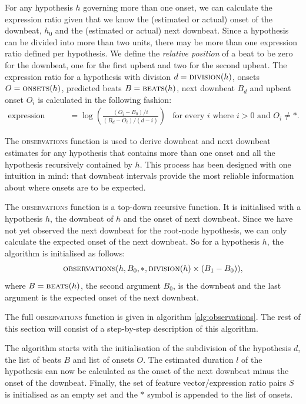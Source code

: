 For any hypothesis $h$ governing more than one onset, we can calculate the expression ratio given that we know the (estimated or actual) onset of the downbeat, $h_0$ and the (estimated or actual) next downbeat. Since a hypothesis can be divided into more than two units, there may be more than one expression ratio defined per hypothesis. We define the \textit{relative position} of a beat to be zero for the downbeat, one for the first upbeat and two for the second upbeat. The expression ratio for a hypothesis with division $d = \textsc{division}(h)$, onsets $O = \textsc{onsets}(h)$, predicted beats $B = \textsc{beats}(h)$, next downbeat $B_d$ and upbeat onset $O_i$ is calculated in the following fashion:
\begin{align}
\label{eq:expression}
\mbox{expression ratio} &= \log\left(\frac{(O_i - B_0) / i}{(B_d - O_i) / (d - i)}\right) & \text{for every $i$ where $i > 0$ and $O_i \neq *$.}
\end{align}

The \textsc{observations} function is used to derive downbeat and next downbeat estimates for any hypothesis that contains more than one onset and all the hypothesis recursively contained by $h$. This process has been designed with one intuition in mind: that downbeat intervals provide the most reliable information about where onsets are to be expected. 

The \textsc{observations} function is a top-down recursive function. It is initialised with a hypothesis $h$, the downbeat of $h$ and the onset of next downbeat. Since we have not yet observed the next downbeat for the root-node hypothesis, we can only calculate the expected onset of the next downbeat. So for a hypothesis $h$, the algorithm is initialised as follows: 
\[\textsc{observations}(h, B_0, *, \textsc{division}(h) \times (B_1 - B_0)),\]
where $B = \textsc{beats}(h)$, the second argument $B_0$, is the downbeat and the last argument is the expected onset of the next downbeat.

The full \textsc{observations} function is given in algorithm \ref{alg:observations}. The rest of this section will consist of a step-by-step description of this algorithm.

The algorithm starts with the initialisation of the subdivision of the hypothesis $d$, the list of beats $B$ and list of onsets $O$. The estimated duration $l$ of the hypothesis can now be calculated as the onset of the next downbeat minus the onset of the downbeat. Finally, the set of feature vector/expression ratio pairs $S$ is initialised as an empty set and the $*$ symbol is appended to the list of onsets.

